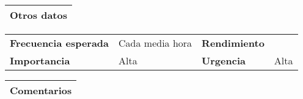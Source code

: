 \documentclass[11pt,a4paper]{article}
\begin{document}
\begin{table}[H]
	\begin{tabularx}{\textwidth}{X}
		\textbf{Otros datos}\\ \hline
	\end{tabularx}
	\begin{tabularx}{\textwidth}{lXlX}
		\textbf{Frecuencia esperada} & Cada media hora & \textbf{Rendimiento} & \\
		\textbf{Importancia} & Alta & \textbf{Urgencia} & Alta\\
	\end{tabularx}
	\begin{tabularx}{\textwidth}{X}
		\textbf{Comentarios}\\ \hline	
	\end{tabularx}
\end{table}
\end{document}
